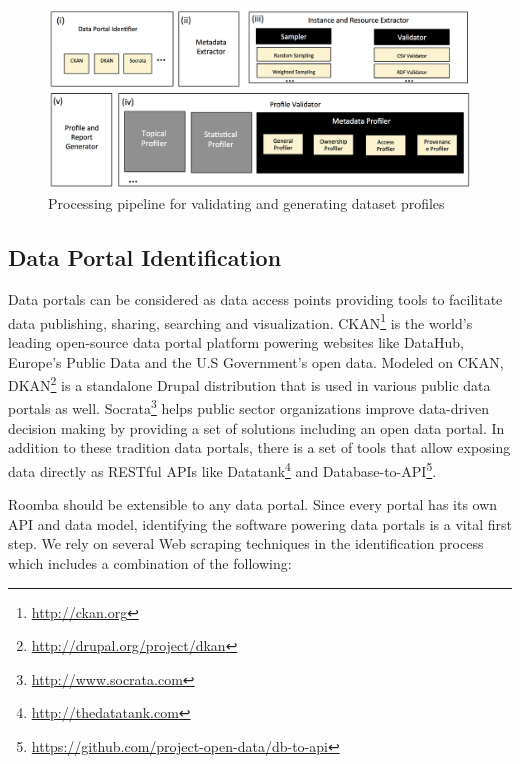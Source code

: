 \documentclass[runningheads,a4paper]{llncs}
\begin{document}
\begin{figure}[!ht]
  \centering
    \includegraphics[scale=0.4]{figure-1_architecture.png}
  \caption{Processing pipeline for validating and generating dataset profiles}
  \label{fig:Roomba_architecture}
\end{figure}

\subsection{Data Portal Identification}

Data portals can be considered as data access points providing tools to facilitate data publishing, sharing, searching and visualization. CKAN\footnote{\url{http://ckan.org}} is the world's leading open-source data portal platform powering websites like DataHub, Europe's Public Data and the U.S Government's open data. Modeled on CKAN, DKAN\footnote{\url{http://drupal.org/project/dkan}} is a standalone Drupal distribution that is used in various public data portals as well. Socrata\footnote{\url{http://www.socrata.com}} helps public sector organizations improve data-driven decision making by providing a set of solutions including an open data portal. In addition to these tradition data portals, there is a set of tools that allow exposing data directly as RESTful APIs like Datatank\footnote{\url{http://thedatatank.com}} and Database-to-API\footnote{\url{https://github.com/project-open-data/db-to-api}}.

Roomba should be extensible to any data portal. Since every portal has its own API and data model, identifying the software powering data portals is a vital first step. We rely on several Web scraping techniques in the identification process which includes a combination of the following:
\end{document}
